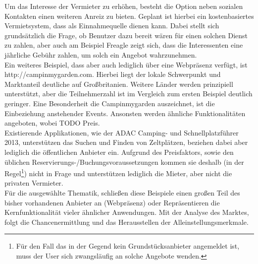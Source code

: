     Um das Interesse der Vermieter zu erhöhen, besteht die Option neben sozialen Kontakten einen weiteren Anreiz zu bieten. Geplant ist hierbei ein kostenbasiertes Vermietsystem, dass als Einnahmequelle dienen kann. Dabei stellt sich grundsätzlich die Frage, ob Benutzer dazu bereit wären für einen solchen Dienst zu zahlen, aber auch am Beispiel Freagle zeigt sich, dass die Interessenten eine jährliche Gebühr zahlen, um solch ein Angebot wahrzunehmen.\\
    
    Ein weiteres Beispiel, dass aber auch lediglich über eine Webpräsenz verfügt, ist \\  http://campinmygarden.com. Hierbei liegt der lokale Schwerpunkt und Marktanteil deutliche auf Großbritanien. Weitere Länder werden prinzipiell unterstützt, aber die Teilnehmerzahl ist im Vergleich zum ersten Beispiel deutlich geringer.
    Eine Besonderheit die Campinmygarden auszeichnet, ist die Einbeziehung anstehender Events. Ansonsten werden ähnliche Funktionalitäten angeboten, wobei TODO Preis.\\

    Existierende Applikationen, wie der ADAC Camping- und Schnellplatzführer 2013, unterstützen das Suchen und Finden von Zeltplätzen, beziehen dabei aber lediglich die öffentlichen Anbieter ein. Aufgrund des Preisfaktors, sowie den üblichen Reservierungs-/Buchungsvoraussetzungen kommen sie deshalb (in der Regel\footnote{Für den Fall das in der Gegend kein Grundstücksanbieter angemeldet ist, muss der User sich zwangsläufig an solche Angebote wenden. }) nicht in Frage und unterstützen lediglich die Mieter, aber nicht die privaten Vermieter.\\

    Für die ausgewählte Thematik, schließen diese Beispiele einen großen Teil des bisher vorhandenen Anbieter an (Webpräsenz) oder Repräsentieren die Kernfunktionalität vieler ähnlicher Anwendungen. 
    Mit der Analyse des Marktes, folgt die Chancenermittlung und das Herausstellen der Alleinstellungsmerkmale.

